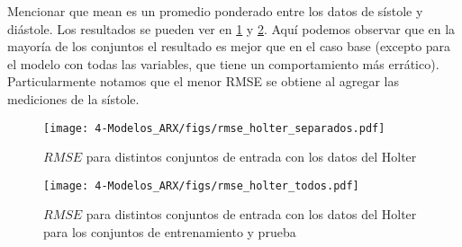 Mencionar que mean es un promedio ponderado entre los datos de sístole y diástole. Los resultados se pueden ver en \ref{fig:rmse_holter_separados} y \ref{fig:rmse_holter_todos}. Aquí podemos observar que en la mayoría de los conjuntos el resultado es mejor que en el caso base (excepto para el modelo con todas las variables, que tiene un comportamiento más errático). Particularmente notamos que el menor RMSE se obtiene al agregar las mediciones de la sístole.



\begin{figure}[H]
	\centering
	\texttt{[image: 4-Modelos\_ARX/figs/rmse\_holter\_separados.pdf]}
	\caption{$RMSE$ para distintos conjuntos de entrada con los datos del Holter}
	\label{fig:rmse_holter_separados}
\end{figure}

\begin{figure}[H]
	\centering
	\texttt{[image: 4-Modelos\_ARX/figs/rmse\_holter\_todos.pdf]}
	\caption{$RMSE$ para distintos conjuntos de entrada con los datos del Holter para los conjuntos de entrenamiento y prueba}
	\label{fig:rmse_holter_todos}
\end{figure}


